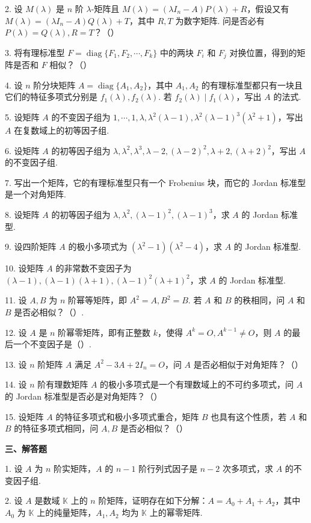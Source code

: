\documentclass[UTF8, 12pt, fontset=fandol, oneside]{ctexart}
\begin{document}
2. 设 $M(\lambda)$ 是 $n$ 阶 $\lambda$-矩阵且 $M(\lambda)=(\lambda I_n-A)P(\lambda)+R$，假设又有 $M(\lambda)=(\lambda I_n-A)Q(\lambda)+T$，其中 $R,T$ 为数字矩阵. 问是否必有 $P(\lambda)=Q(\lambda),R=T$？（\quad）

3. 将有理标准型 $F=\operatorname{diag}\{F_1,F_2,\cdots,F_k\}$ 中的两块 $F_i$ 和 $F_j$ 对换位置，得到的矩阵是否和 $F$ 相似？（\quad）

4. 设 $n$ 阶分块矩阵 $A=\operatorname{diag}\{A_1,A_2\}$，其中 $A_1,A_2$ 的有理标准型都只有一块且它们的特征多项式分别是 $f_1(\lambda),f_2(\lambda)$. 若 $f_2(\lambda)\mid f_1(\lambda)$，写出 $A$ 的法式.

5. 设矩阵 $A$ 的不变因子组为 $1,\cdots,1,\lambda,\lambda^2(\lambda-1),\lambda^2(\lambda-1)^3(\lambda^2+1)$，写出 $A$ 在复数域上的初等因子组.

6. 设矩阵 $A$ 的初等因子组为 $\lambda,\lambda^2,\lambda^3,\lambda-2,(\lambda-2)^2,\lambda+2,(\lambda+2)^2$，写出 $A$ 的不变因子组.

7. 写出一个矩阵，它的有理标准型只有一个 Frobenius 块，而它的 Jordan 标准型是一个对角矩阵.

8. 设矩阵 $A$ 的初等因子组为 $\lambda,\lambda^2,(\lambda-1)^2,(\lambda-1)^3$，求 $A$ 的 Jordan 标准型.

9. 设四阶矩阵 $A$ 的极小多项式为 $(\lambda^2-1)(\lambda^2-4)$，求 $A$ 的 Jordan 标准型.

10. 设矩阵 $A$ 的非常数不变因子为 $(\lambda-1),(\lambda-1)(\lambda+1),(\lambda-1)^2(\lambda+1)^2$，求 $A$ 的 Jordan 标准型.

11. 设 $A,B$ 为 $n$ 阶幂等矩阵，即 $A^2=A,B^2=B$. 若 $A$ 和 $B$ 的秩相同，问 $A$ 和 $B$ 是否必相似？（\quad）.

12. 设 $A$ 是 $n$ 阶幂零矩阵，即有正整数 $k$，使得 $A^k=O,A^{k-1}\ne O$，则 $A$ 的最后一个不变因子是（\quad）.

13. 设 $n$ 阶矩阵 $A$ 满足 $A^2-3A+2I_n=O$，问 $A$ 是否必相似于对角矩阵？（\quad）

14. 设 $n$ 阶有理数矩阵 $A$ 的极小多项式是一个有理数域上的不可约多项式，问 $A$ 的 Jordan 标准型是否必是对角矩阵？（\quad）

15. 设矩阵 $A$ 的特征多项式和极小多项式重合，矩阵 $B$ 也具有这个性质，若 $A$ 和 $B$ 的特征多项式相同，问 $A,B$ 是否必相似？（\quad）

\noindent\textbf{三、解答题}

1. 设 $A$ 为 $n$ 阶实矩阵，$A$ 的 $n-1$ 阶行列式因子是 $n-2$ 次多项式，求 $A$ 的不变因子组.

2. 设 $A$ 是数域 $\mathbb{K}$ 上的 $n$ 阶矩阵，证明存在如下分解：$A=A_0+A_1+A_2$，其中 $A_0$ 为 $\mathbb{K}$ 上的纯量矩阵，$A_1,A_2$ 均为 $\mathbb{K}$ 上的幂零矩阵.
\end{document}
